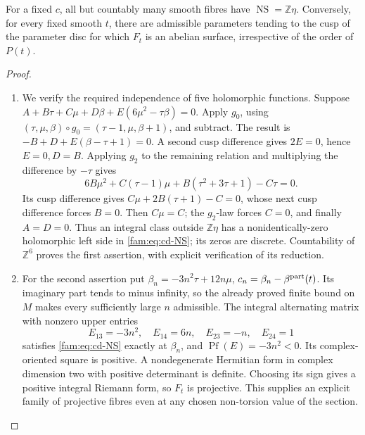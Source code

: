 \begin{proposition}\hypertarget{tag-01QV}{}\label{fam:src:D.1.5}\label{fam:st:D.1.5}

For a fixed \(c\), all but countably many smooth fibres have
\(\operatorname{NS}=\mathbb Z\eta\). Conversely, for every fixed smooth
\(t\), there are admissible parameters tending to the cusp of the
parameter disc for which \(F_t\) is an abelian surface, irrespective of
the order of \(P(t)\).
\end{proposition}


\begin{proof}
\begin{enumerate}[label=\arabic*.,leftmargin=*]
\item We verify the required independence of five holomorphic functions.
Suppose \(A+B\tau+C\mu+D\beta+E(6\mu^2-\tau\beta)=0\).
Apply \(g_0\), using \((\tau,\mu,\beta)\circ g_0=(\tau-1,\mu,\beta+1)\),
and subtract. The result is \(-B+D+E(\beta-\tau+1)=0\).
A second cusp difference gives \(2E=0\), hence \(E=0,D=B\).
Applying \(g_2\) to the remaining relation and multiplying the difference
by \(-\tau\) gives
\[
 6B\mu^2+C(\tau-1)\mu+B(\tau^2+3\tau+1)-C\tau=0.
\]
Its cusp difference gives \(C\mu+2B(\tau+1)-C=0\), whose next cusp
difference forces \(B=0\). Then \(C\mu=C\); the \(g_2\)-law forces
\(C=0\), and finally \(A=D=0\). Thus an integral class outside
\(\mathbb Z\eta\) has a nonidentically-zero holomorphic left side in
\eqref{fam:eq:cd-NS}; its zeros are discrete. Countability of \(\mathbb Z^6\)
proves the first assertion, with explicit verification of its reduction.

\item For the second assertion put
\(\beta_n=-3n^2\tau+12n\mu\),
\(c_n=\beta_n-\beta^{\rm part}(t)\). Its imaginary part tends to
minus infinity, so the already proved finite bound on \(M\) makes every
sufficiently large \(n\) admissible. The integral alternating matrix
with nonzero upper entries
\[
 E_{13}=-3n^2,\quad E_{14}=6n,\quad E_{23}=-n,\quad E_{24}=1
\]
satisfies \eqref{fam:eq:cd-NS} exactly at \(\beta_n\), and
\(\operatorname{Pf}(E)=-3n^2<0\). Its complex-oriented square is positive.
A nondegenerate Hermitian form in complex dimension two with positive
determinant is definite. Choosing its sign gives a positive integral
Riemann form, so \(F_t\) is projective. This supplies an explicit family
of projective fibres even at any chosen non-torsion value of the section.
\end{enumerate}
\end{proof}

